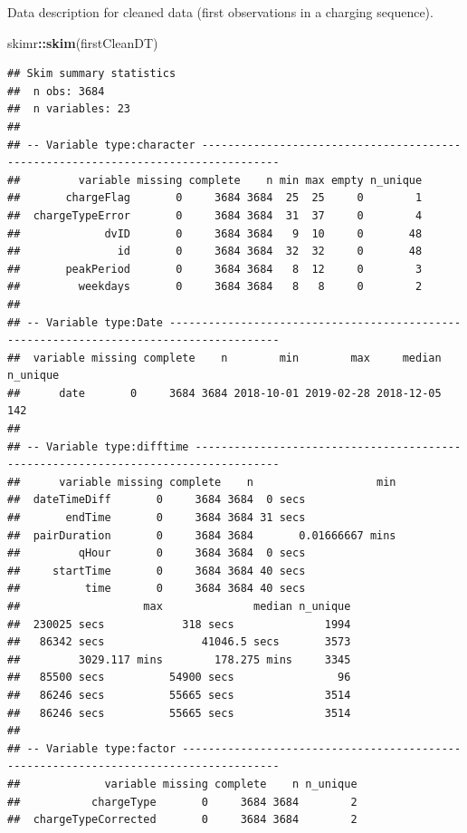\documentclass[]{article}
\newenvironment{Shaded}{\begin{snugshade}}{\end{snugshade}}
\newcommand{\KeywordTok}[1]{\textcolor[rgb]{0.13,0.29,0.53}{\textbf{#1}}}
\newcommand{\NormalTok}[1]{#1}
\newcommand{\OperatorTok}[1]{\textcolor[rgb]{0.81,0.36,0.00}{\textbf{#1}}}
\begin{document}
Data description for cleaned data (first observations in a charging sequence).

\begin{Shaded}
\begin{Highlighting}[]
\NormalTok{skimr}\OperatorTok{::}\KeywordTok{skim}\NormalTok{(firstCleanDT)}
\end{Highlighting}
\end{Shaded}

\begin{verbatim}
## Skim summary statistics
##  n obs: 3684 
##  n variables: 23 
## 
## -- Variable type:character ----------------------------------------------------------------------------------
##         variable missing complete    n min max empty n_unique
##       chargeFlag       0     3684 3684  25  25     0        1
##  chargeTypeError       0     3684 3684  31  37     0        4
##             dvID       0     3684 3684   9  10     0       48
##               id       0     3684 3684  32  32     0       48
##       peakPeriod       0     3684 3684   8  12     0        3
##         weekdays       0     3684 3684   8   8     0        2
## 
## -- Variable type:Date ---------------------------------------------------------------------------------------
##  variable missing complete    n        min        max     median n_unique
##      date       0     3684 3684 2018-10-01 2019-02-28 2018-12-05      142
## 
## -- Variable type:difftime -----------------------------------------------------------------------------------
##      variable missing complete    n                   min
##  dateTimeDiff       0     3684 3684  0 secs              
##       endTime       0     3684 3684 31 secs              
##  pairDuration       0     3684 3684       0.01666667 mins
##         qHour       0     3684 3684  0 secs              
##     startTime       0     3684 3684 40 secs              
##          time       0     3684 3684 40 secs              
##                   max              median n_unique
##  230025 secs            318 secs              1994
##   86342 secs               41046.5 secs       3573
##         3029.117 mins        178.275 mins     3345
##   85500 secs          54900 secs                96
##   86246 secs          55665 secs              3514
##   86246 secs          55665 secs              3514
## 
## -- Variable type:factor -------------------------------------------------------------------------------------
##             variable missing complete    n n_unique
##           chargeType       0     3684 3684        2
##  chargeTypeCorrected       0     3684 3684        2

\end{verbatim}
\end{document}
